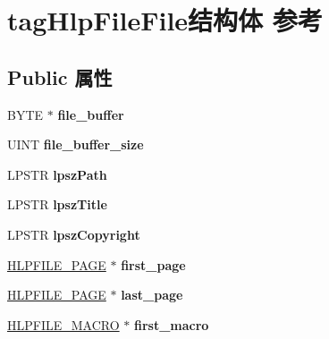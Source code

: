 \hypertarget{structtag_hlp_file_file}{}\section{tag\+Hlp\+File\+File结构体 参考}
\label{structtag_hlp_file_file}
\subsection*{Public 属性}
\begin{DoxyCompactItemize}
\item 
\mbox{\label{structtag_hlp_file_file_ad19e50622de5186c35a9d6f35b234c3a}} 
B\+Y\+TE $\ast$ {\bfseries file\+\_\+buffer}
\item 
\mbox{\label{structtag_hlp_file_file_a70ebf449605674af3b1342cb0b796d4f}} 
U\+I\+NT {\bfseries file\+\_\+buffer\+\_\+size}
\item 
\mbox{\label{structtag_hlp_file_file_ab45069f6cdf33907a51cd0f33e72ccd5}} 
L\+P\+S\+TR {\bfseries lpsz\+Path}
\item 
\mbox{\label{structtag_hlp_file_file_a0fd0d4fa826a8f67222d64163319fa82}} 
L\+P\+S\+TR {\bfseries lpsz\+Title}
\item 
\mbox{\label{structtag_hlp_file_file_ab211bce02e00fa7fbdc7f3db322f61cb}} 
L\+P\+S\+TR {\bfseries lpsz\+Copyright}
\item 
\mbox{\label{structtag_hlp_file_file_a0fd5d38139342135e42e931df2f72f14}} 
\hyperlink{structtag_hlp_file_page}{H\+L\+P\+F\+I\+L\+E\+\_\+\+P\+A\+GE} $\ast$ {\bfseries first\+\_\+page}
\item 
\mbox{\label{structtag_hlp_file_file_a1277ab59198a55c1d903fa8c0341b83f}} 
\hyperlink{structtag_hlp_file_page}{H\+L\+P\+F\+I\+L\+E\+\_\+\+P\+A\+GE} $\ast$ {\bfseries last\+\_\+page}
\item 
\mbox{\label{structtag_hlp_file_file_a75e1ee1804ebdb1e758a21ba293e8b88}} 
\hyperlink{structtag_hlp_file_macro}{H\+L\+P\+F\+I\+L\+E\+\_\+\+M\+A\+C\+RO} $\ast$ {\bfseries first\+\_\+macro}

\end{DoxyCompactItemize}
